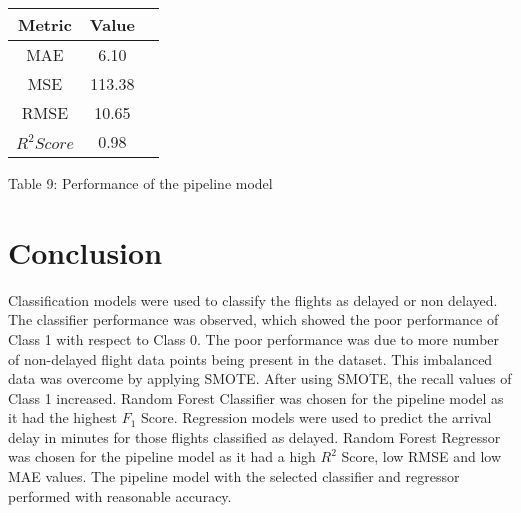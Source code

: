 \documentclass[12pt,letterpaper]{article}
\begin{document}
    \begin{center}
        \begin{tabular}{ |c|c|c|} 
         \hline
         Metric & Value\\ 
         \hline
         MAE & 6.10 \\ 
         \hline
         MSE & 113.38 \\ 
         \hline
         RMSE & 10.65\\ 
         \hline
         $R^2 Score$ & 0.98\\ 
         \hline
        \end{tabular}
    \end{center}
    \begin{center}
            Table 9: Performance of the pipeline model
    \end{center}

    \paragraph{}
    


\section{Conclusion} 

    Classification models were used to classify the flights as delayed or non delayed. The classifier performance was observed, which showed the poor performance of Class 1 with respect to Class 0. The poor performance was due to more number of non-delayed flight data points being present in the dataset. This imbalanced data was overcome by applying SMOTE. After using SMOTE, the recall values of Class 1 increased. Random Forest Classifier was chosen for the pipeline model as it had the highest $F_1$ Score. Regression models were used to predict the arrival delay in minutes for those flights classified as delayed. Random Forest Regressor was chosen for the pipeline model as it had a high $R^2$ Score, low RMSE and low MAE values. The pipeline model with the selected classifier and regressor performed with reasonable accuracy.

    
\end{document}
